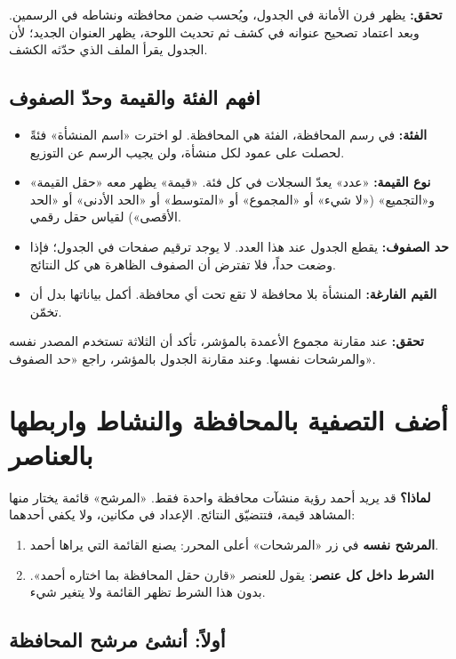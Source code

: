 \textbf{تحقق:} يظهر فرن الأمانة في الجدول، ويُحسب ضمن محافظته ونشاطه في الرسمين. وبعد اعتماد تصحيح عنوانه في كشف ثم تحديث اللوحة، يظهر العنوان الجديد؛ لأن الجدول يقرأ الملف الذي حدّثه الكشف.

\subsection{افهم الفئة والقيمة وحدّ الصفوف}

\begin{itemize}
\item \textbf{الفئة:} في رسم المحافظة، الفئة هي المحافظة. لو اخترت «اسم المنشأة» فئةً لحصلت على عمود لكل منشأة، ولن يجيب الرسم عن التوزيع.
\item \textbf{نوع القيمة:} «عدد» يعدّ السجلات في كل فئة. «قيمة» يظهر معه «حقل القيمة» و«التجميع» («لا شيء» أو «المجموع» أو «المتوسط» أو «الحد الأدنى» أو «الحد الأقصى») لقياس حقل رقمي.
\item \textbf{حد الصفوف:} يقطع الجدول عند هذا العدد. لا يوجد ترقيم صفحات في الجدول؛ فإذا وضعت حداً، فلا تفترض أن الصفوف الظاهرة هي كل النتائج.
\item \textbf{القيم الفارغة:} المنشأة بلا محافظة لا تقع تحت أي محافظة. أكمل بياناتها بدل أن تخمّن.
\end{itemize}

\textbf{تحقق:} عند مقارنة مجموع الأعمدة بالمؤشر، تأكد أن الثلاثة تستخدم المصدر نفسه والمرشحات نفسها. وعند مقارنة الجدول بالمؤشر، راجع «حد الصفوف».

\section{أضف التصفية بالمحافظة والنشاط واربطها بالعناصر}
\label{sec:build-dashboard-filters}

\textbf{لماذا؟} قد يريد أحمد رؤية منشآت محافظة واحدة فقط. «المرشح» قائمة يختار منها المشاهد قيمة، فتتضيّق النتائج. الإعداد في مكانين، ولا يكفي أحدهما:

\begin{enumerate}
\item \textbf{المرشح نفسه} في زر «المرشحات» أعلى المحرر: يصنع القائمة التي يراها أحمد.
\item \textbf{الشرط داخل كل عنصر}: يقول للعنصر «قارن حقل المحافظة بما اختاره أحمد». بدون هذا الشرط تظهر القائمة ولا يتغير شيء.
\end{enumerate}

\subsection{أولاً: أنشئ مرشح المحافظة}

